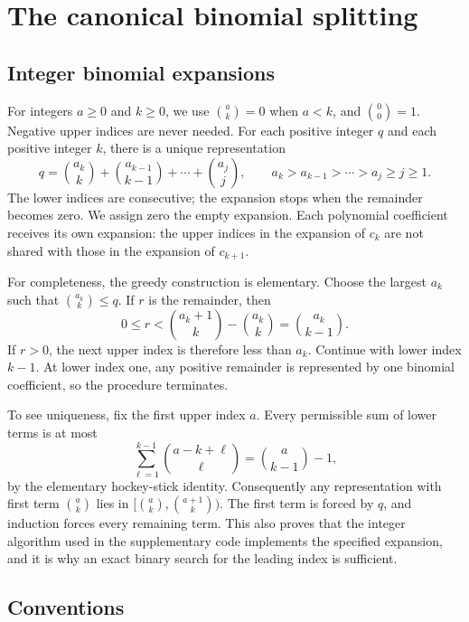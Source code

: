 \documentclass[11pt,letterpaper]{article}
\numberwithin{equation}{section}
\theoremstyle{definition}
\theoremstyle{remark}
\begin{document}
\section{The canonical binomial splitting}\label{sec:definition}

\subsection{Integer binomial expansions}

For integers $a\ge0$ and $k\ge0$, we use
$\binom ak=0$ when $a<k$, and $\binom00=1$. Negative upper indices are never
needed. For each positive integer $q$ and each positive
integer $k$, there is a unique representation
\begin{equation}\label{eq:binexp}
 q=\binom{a_k}{k}+\binom{a_{k-1}}{k-1}+\cdots+\binom{a_j}{j},
 \qquad a_k>a_{k-1}>\cdots>a_j\ge j\ge1.
\end{equation}
The lower indices are consecutive; the expansion stops when the remainder
becomes zero. We assign zero the empty expansion. Each polynomial coefficient
receives its own expansion: the upper indices in the expansion of $c_k$ are
not shared with those in the expansion of $c_{k+1}$.

For completeness, the greedy construction is elementary. Choose the largest
$a_k$ such that $\binom{a_k}{k}\le q$. If $r$ is the remainder, then
\[
 0\le r<\binom{a_k+1}{k}-\binom{a_k}{k}
       =\binom{a_k}{k-1}.
\]
If $r>0$, the next upper index is therefore less than $a_k$. Continue with
lower index $k-1$. At lower index one, any positive remainder is represented
by one binomial coefficient, so the procedure terminates.

To see uniqueness, fix the first upper index $a$. Every permissible sum of
lower terms is at most
\[
 \sum_{\ell=1}^{k-1}\binom{a-k+\ell}{\ell}
 =\binom{a}{k-1}-1,
\]
by the elementary hockey-stick identity.
Consequently any representation with first term $\binom ak$ lies in
$[\binom ak,\binom{a+1}{k})$. The first term is forced by $q$, and induction
forces every remaining term. This also proves that the integer algorithm
used in the supplementary code implements the specified expansion, and it is
why an exact binary search for the leading index is sufficient.

\subsection{Conventions}\label{subsec:conventions}
\end{document}
